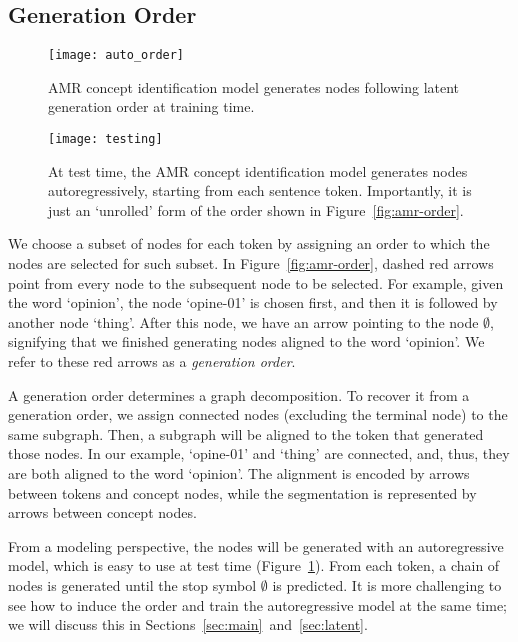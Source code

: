 \documentclass[11pt]{article}
\begin{document}
\subsection{Generation Order}  \label{sec:generation_order}
\begin{figure}[t!]
\centering
\texttt{[image: auto\_order]}
\vspace{-2ex}
\caption{AMR concept identification model generates nodes following latent generation order at training time.} \label{fig:amr-order}
\centering
\texttt{[image: testing]}
\vspace{-2ex}
\caption{At test time, the AMR concept identification model generates nodes autoregressively, starting from each sentence token. Importantly, it is just an `unrolled' form of the order shown in Figure~\ref{fig:amr-order}.} \label{fig:seg_testing}
\end{figure}





We choose a subset of nodes for each token by assigning an order to which the nodes are selected for such subset.  In Figure~\ref{fig:amr-order}, dashed red arrows point from every node to the subsequent node to be selected.  For example, given the word `opinion', the node `opine-01' is chosen first, and then it is followed by another node `thing'. After this node, we have an arrow pointing to the node $\emptyset $, signifying that we finished generating nodes aligned to the word `opinion'. We refer to these red arrows as a {\it generation order}. 

A generation order determines a graph decomposition. To recover it from a generation order, we assign connected nodes (excluding the terminal node) to the same subgraph. Then, a subgraph will be aligned to the token that generated those nodes. In our example, `opine-01' and `thing' are connected, and, thus, they are both aligned to the word `opinion'. The alignment is encoded by arrows between tokens and concept nodes, while the segmentation is represented by arrows between concept nodes.

From a modeling perspective, the nodes will be generated with an autoregressive model,
which is easy to use at test time  (Figure~\ref{fig:seg_testing}). From each token, a chain of nodes is generated until the stop symbol $\emptyset $  is predicted.  It is more challenging to see how to induce the order and train the autoregressive model at the same time; we will discuss this in Sections~\ref{sec:main}~and~\ref{sec:latent}.
\end{document}
